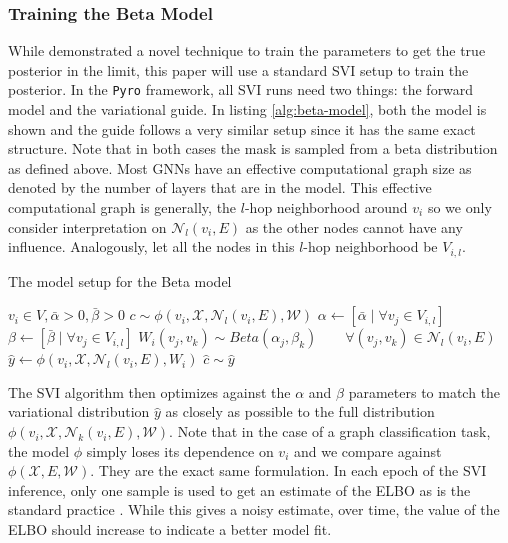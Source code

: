 \subsubsection{Training the Beta Model}
While \cite{bolla_estimating_2017} demonstrated a novel technique to train the parameters to get the true posterior in the limit, this paper will use a standard SVI setup to train the posterior. In the \verb|Pyro| framework, all SVI runs need two things: the forward model and the variational guide. In listing \ref{alg:beta-model}, both the model is shown and the guide follows a very similar setup since it has the same exact structure. Note that in both cases the mask is sampled from a beta distribution as defined above. Most GNNs have an effective computational graph size as denoted by the number of layers that are in the model. This effective computational graph is generally, the $l$-hop neighborhood around $v_i$ so we only consider interpretation on $\mathcal{N}_l(v_i, E)$ as the other nodes cannot have any influence. Analogously, let all the nodes in this $l$-hop neighborhood be $V_{i,l}$.
\begin{algorithm}[h]
	\centering
	\caption{The model setup for the Beta model}
	\label{alg:beta-model}
	\begin{algorithmic}
		\Require $v_i \in V, \bar{\alpha} > 0, \bar{\beta} > 0$
		\Require $c \sim \phi(v_i, \mathcal{X}, \mathcal{N}_l(v_i, E), \mathcal{W})$
		\State $\alpha \gets [\bar{\alpha} \mid \forall v_j \in V_{i,l}]$
		\State $\beta \gets [\bar{\beta} \mid \forall v_j \in V_{i, l}]$
		\State $W_i(v_j, v_k) \sim Beta(\alpha_j, \beta_k) \quad\quad \forall (v_j, v_k) \in \mathcal{N}_l(v_i, E)$
		\State $\hat{y} \gets \phi(v_i, \mathcal{X}, \mathcal{N}_l(v_i, E), W_i)$
		\State $\hat{c} \sim \hat{y}$
	\end{algorithmic}
\end{algorithm}

The SVI algorithm then optimizes against the $\alpha$ and $\beta$ parameters to match the variational distribution $\hat{y}$ as closely as possible to the full distribution $\phi(v_i, \mathcal{X}, \mathcal{N}_k(v_i, E), \mathcal{W})$. Note that in the case of a graph classification task, the model $\phi$ simply loses its dependence on $v_i$ and we compare against $\phi(\mathcal{X}, E, \mathcal{W})$. They are the exact same formulation. In each epoch of the SVI inference, only one sample is used to get an estimate of the ELBO as is the standard practice \cite{jospin_hands-bayesian_2022}. While this gives a noisy estimate, over time, the value of the ELBO should increase to indicate a better model fit.

